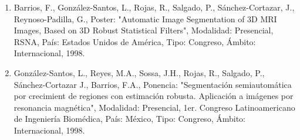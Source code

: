 \begin{enumerate}
\item Barrios, F., González-Santos, L., Rojas, R., Salgado, P., Sánchez-Cortazar, J., Reynoso-Padilla, G., Poster: "Automatic 
Image Segmentation of 3D MRI Images, Based on 3D Robust Statistical Filters", Modalidad: Presencial, RSNA, País: Estados 
Unidos de América, Tipo: Congreso, Ámbito: Internacional, 1998.

\item González-Santos, L., Reyes, M.A., Sossa, J.H., Rojas, R., Salgado, P., Sánchez-Cortazar J., Barrios, F.A., Ponencia: 
"Segmentación semiautomática por crecimient de regiones con estimación robusta. Aplicación a imágenes por resonancia 
magnética", Modalidad: Presencial, 1er. Congreso Latinoamericano de Ingeniería Biomédica, País: México, Tipo: Congreso, 
Ámbito: Internacional, 1998.

\end{enumerate}




